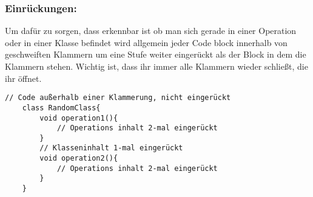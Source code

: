 \subsubsection*{Einrückungen:}
Um dafür zu sorgen, dass erkennbar ist ob man sich gerade in einer Operation oder in einer Klasse befindet wird allgemein jeder Code block innerhalb von geschweiften Klammern um eine Stufe weiter eingerückt als der Block in dem die Klammern stehen.
Wichtig ist, dass ihr immer alle Klammern wieder schließt, die ihr öffnet.

\vspace{5mm}

\begin{lstlisting}[title=\textbf{Beispiel gute Namensgebung}]
	// Code außerhalb einer Klammerung, nicht eingerückt
	class RandomClass{
		void operation1(){
			// Operations inhalt 2-mal eingerückt
		}
		// Klasseninhalt 1-mal eingerückt
		void operation2(){
			// Operations inhalt 2-mal eingerückt
		}
	}
	
\end{lstlisting}
